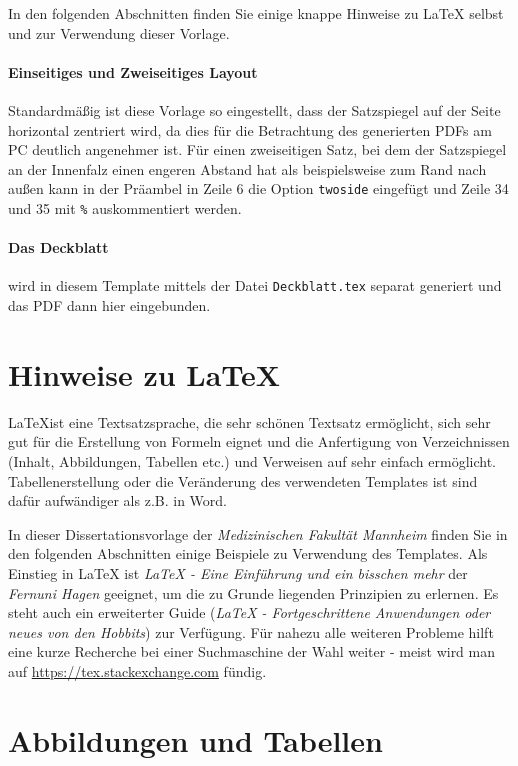 \documentclass{scrreprt}
\begin{document}
In den folgenden Abschnitten finden Sie einige knappe Hinweise zu LaTeX selbst und zur Verwendung dieser Vorlage. 

\paragraph{Einseitiges und Zweiseitiges Layout}
Standardmäßig ist diese Vorlage so eingestellt, dass der Satzspiegel auf der Seite horizontal zentriert wird, da dies für die Betrachtung des generierten PDFs am PC deutlich angenehmer ist. Für einen zweiseitigen Satz, bei dem der Satzspiegel an der Innenfalz einen engeren Abstand hat als beispielsweise zum Rand nach außen kann in der Präambel in Zeile 6 die Option \verb|twoside| eingefügt und Zeile 34 und 35 mit \verb|%| auskommentiert werden. 

\paragraph{Das Deckblatt} wird in diesem Template mittels der Datei \verb|Deckblatt.tex| separat generiert und das PDF dann hier eingebunden. 

\section{Hinweise zu \LaTeX}
\LaTeX ist eine Textsatzsprache, die sehr schönen Textsatz ermöglicht, sich sehr gut für die Erstellung von Formeln eignet und die Anfertigung von Verzeichnissen (Inhalt, Abbildungen, Tabellen etc.) und Verweisen auf sehr einfach ermöglicht. Tabellenerstellung oder die Veränderung des verwendeten Templates ist sind dafür aufwändiger als z.B. in Word. 

In dieser Dissertationsvorlage der \textit{Medizinischen Fakultät Mannheim} finden Sie in den folgenden Abschnitten einige Beispiele zu Verwendung des Templates. Als Einstieg in LaTeX  ist  \textit{LaTeX - Eine Einführung und ein bisschen mehr} \cite{LaTeX_Guide_1} der \textit{Fernuni Hagen} geeignet, um die zu Grunde liegenden Prinzipien zu erlernen. Es steht auch ein erweiterter Guide (\textit{LaTeX - Fortgeschrittene Anwendungen oder neues von den Hobbits}) \cite{LaTeX_Guide_2} zur Verfügung. Für nahezu alle weiteren Probleme hilft eine kurze Recherche bei einer Suchmaschine der Wahl weiter - meist wird man auf \url{https://tex.stackexchange.com} fündig. 

\section{Abbildungen und Tabellen}
\end{document}
